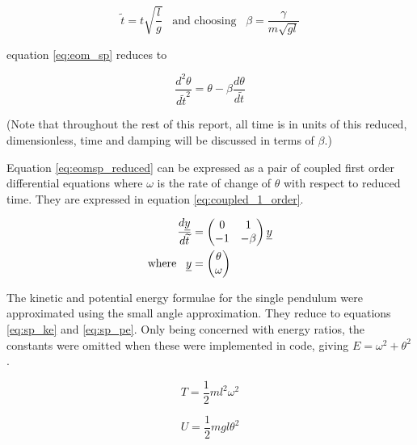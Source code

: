 \documentclass[11pt]{article}
\begin{document}
\begin{equation} \label{eq:const_def}
	\widetilde{t} = t\sqrt{\frac{l}{g}} \;\;\; \text{and choosing} \;\;\; \beta = \frac{\gamma}{m \sqrt{gl}}
\end{equation}

equation \ref{eq:eom_sp} reduces to

\begin{equation} \label{eq:eomsp_reduced}
	\frac{d^2 \theta}{d\widetilde{t}^2} = \theta - \beta\frac{d\theta}{d\widetilde{t}}
\end{equation}

\begin{it}
(Note that throughout the rest of this report, all time is in units of this reduced, dimensionless, time and damping will be discussed in terms of $\beta$.)
\end{it}

Equation \ref{eq:eomsp_reduced} can be expressed as a pair of coupled first order differential equations where $\omega$ is the rate of change of $\theta$ with respect to reduced time. They are expressed in equation \ref{eq:coupled_1_order}.

\begin{equation} \label{eq:coupled_1_order}
\begin{split}
	\frac{d \uline{y}}{d\widetilde{t}} &= \begin{pmatrix} 0 & 1 \\ -1 & -\beta \end{pmatrix} \uline{y} \\
	\text{where} \;\;\; \uline{y} &= \begin{pmatrix}\theta \\ \omega \end{pmatrix}
\end{split}
\end{equation}

The kinetic and potential energy formulae for the single pendulum were approximated using the small angle approximation. They reduce to equations \ref{eq:sp_ke} and \ref{eq:sp_pe}. Only being concerned with energy ratios, the constants were omitted when these were implemented in code, giving $E = \omega^2 + \theta^2$.

\begin{equation} \label{eq:sp_ke}
T = \frac{1}{2}ml^2\omega^2
\end{equation}

\begin{equation} \label{eq:sp_pe}
U = \frac{1}{2}mgl\theta^2
\end{equation}
\end{document}

